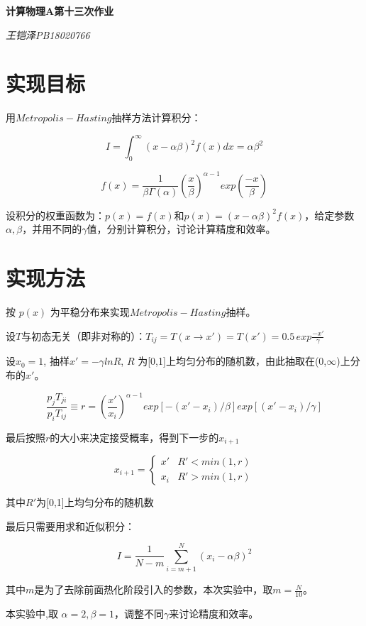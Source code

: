 \documentclass[UTF8]{ctexart}
\begin{document}
	\centering\textbf{\LARGE{计算物理A第十三次作业}}
	
	
	\textit{王铠泽\qquad PB18020766}
	
		
	\section{实现目标}
	
	\begin{flushleft}
		用$ Metropolis-Hasting $抽样方法计算积分：
	\end{flushleft}
	
	$$I=\int_{0}^{\infty}(x-\alpha\beta)^2f(x)dx=\alpha\beta^2$$
	
	$$f(x)=\frac{1}{\beta\Gamma(\alpha)}{\left( \frac{x}{\beta}\right)}^{\alpha-1}exp(\frac{-x}{\beta})$$
	
	\begin{flushleft}
		设积分的权重函数为：$p(x)=f(x)$和$p(x)={(x-\alpha\beta)}^2f(x)$，给定参数$\alpha,\beta$，并用不同的$\gamma$值，分别计算积分，讨论计算精度和效率。
	\end{flushleft}
	
	
	
	\section{实现方法}
	
	\begin{flushleft}
		按 $p(x)$ 为平稳分布来实现$ Metropolis-Hasting $抽样。
		
		设$T$与初态无关（即非对称的）：$T_{ij}=T(x\rightarrow x')=T(x')=0.5 \,exp\frac{-x'}{\gamma}$
		
		设$x_0=1$, 抽样$x'=-\gamma lnR$, $R$ 为[0,1]上均匀分布的随机数，由此抽取在(0,$\infty$)上分布的$x'$。
		
		$$\frac{p_{j}T_{ji}}{p_iT_{ij}}\equiv r=\left( \frac{x'}{x_i}\right) ^{\alpha-1}exp[-(x'-x_i)/\beta]exp[(x'-x_i)/\gamma]$$
		
		最后按照$r$的大小来决定接受概率，得到下一步的$x_{i+1}$
		
$$x_{i+1}=
\begin{cases}
	x'& {R'<min(1,r)}\\
	x_i&{R'>min(1,r)}
\end{cases}$$

其中$R'$为[0,1]上均匀分布的随机数

最后只需要用求和近似积分：

$$I=\frac{1}{N-m}\sum_{i=m+1}^{N}(x_i-\alpha\beta)^2$$

其中$m$是为了去除前面热化阶段引入的参数，本次实验中，取$m=\frac{N}{10}$。

本实验中,取 $\alpha=2,\beta=1$，调整不同$\gamma$来讨论精度和效率。

	\end{flushleft}
	
\end{document}
